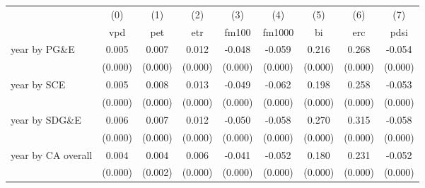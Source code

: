 \begin{tabular}{lcccccccc} \toprule 
 \midrule 
& (0)& (1)& (2)& (3)& (4)& (5)& (6)& (7)\\ 
& vpd& pet& etr& fm100& fm1000& bi& erc& pdsi\\ 
\midrule 
 year by PG\&E & 0.005  & 0.007  & 0.012  & -0.048  & -0.059  & 0.216  & 0.268  & -0.054 \\ 
 & (0.000)  & (0.000)  & (0.000)  & (0.000)  & (0.000)  & (0.000)  & (0.000)  & (0.000) \\ 
year by SCE & 0.005  & 0.008  & 0.013  & -0.049  & -0.062  & 0.198  & 0.258  & -0.053 \\ 
 & (0.000)  & (0.000)  & (0.000)  & (0.000)  & (0.000)  & (0.000)  & (0.000)  & (0.000) \\ 
year by SDG\&E & 0.006  & 0.007  & 0.012  & -0.050  & -0.058  & 0.270  & 0.315  & -0.058 \\ 
 & (0.000)  & (0.000)  & (0.000)  & (0.000)  & (0.000)  & (0.000)  & (0.000)  & (0.000) \\ 
year by CA overall & 0.004  & 0.004  & 0.006  & -0.041  & -0.052  & 0.180  & 0.231  & -0.052 \\ 
 & (0.000)  & (0.002)  & (0.000)  & (0.000)  & (0.000)  & (0.000)  & (0.000)  & (0.000) \\ 
\bottomrule 
\end{tabular}